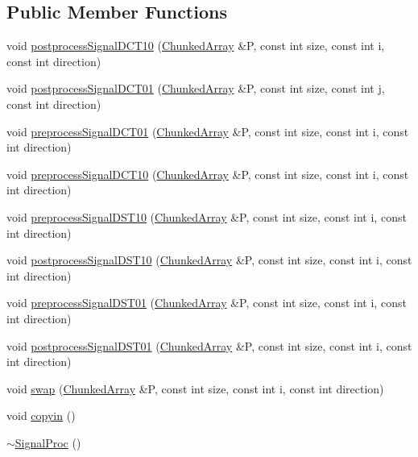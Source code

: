 \subsection*{Public Member Functions}
\begin{DoxyCompactItemize}
\item 
void \mbox{\hyperlink{classSignalProc_a5f3eedc058066d233a1fc8f9d7bc4ea4}{postprocess\+Signal\+D\+C\+T10}} (\mbox{\hyperlink{classChunkedArray}{Chunked\+Array}} \&P, const int size, const int i, const int direction)
\item 
void \mbox{\hyperlink{classSignalProc_af9130e26afc367410205f564ee69d8df}{postprocess\+Signal\+D\+C\+T01}} (\mbox{\hyperlink{classChunkedArray}{Chunked\+Array}} \&P, const int size, const int j, const int direction)
\item 
void \mbox{\hyperlink{classSignalProc_a524c586ab4356908dfc87f049a202285}{preprocess\+Signal\+D\+C\+T01}} (\mbox{\hyperlink{classChunkedArray}{Chunked\+Array}} \&P, const int size, const int i, const int direction)
\item 
void \mbox{\hyperlink{classSignalProc_abe604e9fda0e105619688c7524c96137}{preprocess\+Signal\+D\+C\+T10}} (\mbox{\hyperlink{classChunkedArray}{Chunked\+Array}} \&P, const int size, const int i, const int direction)
\item 
void \mbox{\hyperlink{classSignalProc_a76b93fa1929f4f80d1ddeb93c5d3eac1}{preprocess\+Signal\+D\+S\+T10}} (\mbox{\hyperlink{classChunkedArray}{Chunked\+Array}} \&P, const int size, const int i, const int direction)
\item 
void \mbox{\hyperlink{classSignalProc_ada9700d179aee4007811a3aa61a3fad5}{postprocess\+Signal\+D\+S\+T10}} (\mbox{\hyperlink{classChunkedArray}{Chunked\+Array}} \&P, const int size, const int i, const int direction)
\item 
void \mbox{\hyperlink{classSignalProc_a163a1a849ac2a30aa756c8d45b40dde1}{preprocess\+Signal\+D\+S\+T01}} (\mbox{\hyperlink{classChunkedArray}{Chunked\+Array}} \&P, const int size, const int i, const int direction)
\item 
void \mbox{\hyperlink{classSignalProc_a686e7c9a474f519a204782145e6a2c8e}{postprocess\+Signal\+D\+S\+T01}} (\mbox{\hyperlink{classChunkedArray}{Chunked\+Array}} \&P, const int size, const int i, const int direction)
\item 
void \mbox{\hyperlink{classSignalProc_a9bae65ace51f0ea5cf62283a20dc9a27}{swap}} (\mbox{\hyperlink{classChunkedArray}{Chunked\+Array}} \&P, const int size, const int i, const int direction)
\item 
void \mbox{\hyperlink{classSignalProc_a8cd947bf0b29450012a8ec2939cf8cdc}{copyin}} ()
\item 
\mbox{\hyperlink{classSignalProc_a8a38a90716c66a1e634135f4e76d434b}{$\sim$\+Signal\+Proc}} ()
\end{DoxyCompactItemize}


